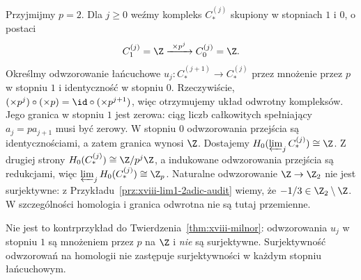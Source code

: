 \begin{przyklad}
Przyjmijmy $p=2$. Dla $j\ge0$ weźmy
kompleks $C^{(j)}_*$ skupiony w stopniach $1$ i $0$,
o postaci
\[
C^{(j)}_1=\Z\xrightarrow{\ \times p^j\ }
C^{(j)}_0=\Z.
\]
Określmy odwzorowanie łańcuchowe
$u_j:C^{(j+1)}_*\to C^{(j)}_*$
przez mnożenie przez $p$ w stopniu $1$ i identyczność
w stopniu $0$. Rzeczywiście,
$(\times p^j)\circ(\times p)
=\id\circ(\times p^{j+1})$,
więc otrzymujemy układ odwrotny kompleksów.
Jego granica w stopniu $1$ jest zerowa:
ciąg liczb całkowitych spełniający
$a_j=pa_{j+1}$ musi być zerowy.
W stopniu $0$ odwzorowania przejścia są
identycznościami, a zatem granica wynosi $\Z$.
Dostajemy $H_0(\varprojlim_j C^{(j)}_*)\cong\Z$.
Z drugiej strony
$H_0(C^{(j)}_*)\cong\Z/p^j\Z$,
a indukowane odwzorowania przejścia są
redukcjami, więc
$\varprojlim_j H_0(C^{(j)}_*)\cong\Z_p$.
Naturalne odwzorowanie $\Z\to\Z_2$ nie jest
surjektywne: z Przykładu~\ref{prz:xviii-lim1-2adic-audit}
wiemy, że $-1/3\in\Z_2\setminus\Z$.
W szczególności homologia i granica odwrotna
nie są tutaj przemienne.

Nie jest to kontrprzykład do
Twierdzenia~\ref{thm:xviii-milnor}:
odwzorowania $u_j$ w stopniu $1$
są mnożeniem przez $p$ na $\Z$ i \emph{nie}
są surjektywne. Surjektywność odwzorowań
na homologii nie zastępuje surjektywności
w każdym stopniu łańcuchowym.
\end{przyklad}

